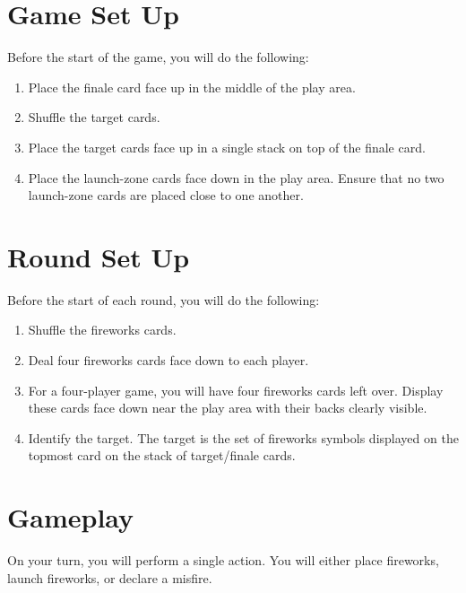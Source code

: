 \documentclass[a6paper, 12pt, parskip=half, DIV=14]{scrartcl}
\begin{document}
\section*{Game Set Up}
Before the start of the game, you will do the following:
\begin{enumerate}[leftmargin=*]
  \item Place the finale card face up in the middle of the play area.

  \item Shuffle the target cards.
    
  \item Place the target cards face up in a single stack on top of the finale card.
  
  \item Place the launch-zone cards face down in the play area. Ensure that no two launch-zone cards are placed close to one another.

\end{enumerate}

\newpage
\enlargethispage{1.75\baselineskip}
\section*{Round Set Up}
Before the start of each round, you will do the following:
\begin{enumerate}[leftmargin=*]
  \item Shuffle the fireworks cards.
  
  \item Deal four fireworks cards face down to each player.
  
  \item For a four-player game, you will have four fireworks cards left over. Display these cards face down near the play area with their backs clearly visible.
  
  \item Identify the target. The target is the set of fireworks symbols displayed on the topmost card on the stack of target/finale cards.

\end{enumerate}

\newpage
\enlargethispage{1.75\baselineskip}

\section*{Gameplay}
On your turn, you will perform a single action. You will either place fireworks, launch fireworks, or declare a misfire.
\end{document}
